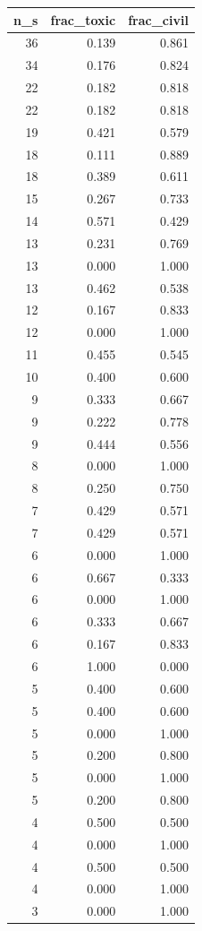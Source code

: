 \begin{tabular}{rrr}
\toprule
n_s & frac_toxic & frac_civil \\
\midrule
36 & 0.139 & 0.861 \\
34 & 0.176 & 0.824 \\
22 & 0.182 & 0.818 \\
22 & 0.182 & 0.818 \\
19 & 0.421 & 0.579 \\
18 & 0.111 & 0.889 \\
18 & 0.389 & 0.611 \\
15 & 0.267 & 0.733 \\
14 & 0.571 & 0.429 \\
13 & 0.231 & 0.769 \\
13 & 0.000 & 1.000 \\
13 & 0.462 & 0.538 \\
12 & 0.167 & 0.833 \\
12 & 0.000 & 1.000 \\
11 & 0.455 & 0.545 \\
10 & 0.400 & 0.600 \\
9 & 0.333 & 0.667 \\
9 & 0.222 & 0.778 \\
9 & 0.444 & 0.556 \\
8 & 0.000 & 1.000 \\
8 & 0.250 & 0.750 \\
7 & 0.429 & 0.571 \\
7 & 0.429 & 0.571 \\
6 & 0.000 & 1.000 \\
6 & 0.667 & 0.333 \\
6 & 0.000 & 1.000 \\
6 & 0.333 & 0.667 \\
6 & 0.167 & 0.833 \\
6 & 1.000 & 0.000 \\
5 & 0.400 & 0.600 \\
5 & 0.400 & 0.600 \\
5 & 0.000 & 1.000 \\
5 & 0.200 & 0.800 \\
5 & 0.000 & 1.000 \\
5 & 0.200 & 0.800 \\
4 & 0.500 & 0.500 \\
4 & 0.000 & 1.000 \\
4 & 0.500 & 0.500 \\
4 & 0.000 & 1.000 \\
3 & 0.000 & 1.000 \\

\end{tabular}
